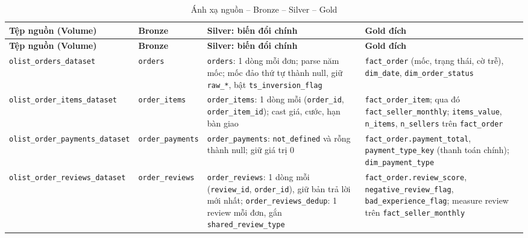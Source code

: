 \documentclass[a4paper]{article}
\begin{document}
{\footnotesize
\setlength{\tabcolsep}{3pt}
\renewcommand{\arraystretch}{1.12}
\begin{longtable}{@{}>{\raggedright\arraybackslash}p{2.9cm}>{\raggedright\arraybackslash}p{2.5cm}>{\raggedright\arraybackslash}p{5.2cm}>{\raggedright\arraybackslash}p{5.2cm}@{}}
\caption{Ánh xạ nguồn -- Bronze -- Silver -- Gold}\label{tab:pl_s2t}\\
\toprule
\textbf{Tệp nguồn (Volume)} & \textbf{Bronze} & \textbf{Silver: biến đổi chính} & \textbf{Gold đích} \\
\midrule
\endfirsthead
\toprule
\textbf{Tệp nguồn (Volume)} & \textbf{Bronze} & \textbf{Silver: biến đổi chính} & \textbf{Gold đích} \\
\midrule
\endhead
\bottomrule
\endfoot
\texttt{olist\_\allowbreak{}orders\_\allowbreak{}dataset} & \texttt{orders} & \texttt{orders}: 1 dòng mỗi đơn; parse năm mốc; mốc đảo thứ tự thành null, giữ \texttt{raw\_\allowbreak{}*}, bật \texttt{ts\_\allowbreak{}inversion\_\allowbreak{}flag} & \texttt{fact\_\allowbreak{}order} (mốc, trạng thái, cờ trễ), \texttt{dim\_\allowbreak{}date}, \texttt{dim\_\allowbreak{}order\_\allowbreak{}status} \\
\addlinespace
\texttt{olist\_\allowbreak{}order\_\allowbreak{}items\_\allowbreak{}dataset} & \texttt{order\_\allowbreak{}items} & \texttt{order\_\allowbreak{}items}: 1 dòng mỗi (\texttt{order\_\allowbreak{}id}, \texttt{order\_\allowbreak{}item\_\allowbreak{}id}); cast giá, cước, hạn bàn giao & \texttt{fact\_\allowbreak{}order\_\allowbreak{}item}; qua đó \texttt{fact\_\allowbreak{}seller\_\allowbreak{}monthly}; \texttt{items\_\allowbreak{}value}, \texttt{n\_\allowbreak{}items}, \texttt{n\_\allowbreak{}sellers} trên \texttt{fact\_\allowbreak{}order} \\
\addlinespace
\texttt{olist\_\allowbreak{}order\_\allowbreak{}payments\_\allowbreak{}dataset} & \texttt{order\_\allowbreak{}payments} & \texttt{order\_\allowbreak{}payments}: \texttt{not\_\allowbreak{}defined} và rỗng thành null; giữ giá trị 0 & \texttt{fact\_\allowbreak{}order.payment\_\allowbreak{}total}, \texttt{payment\_\allowbreak{}type\_\allowbreak{}key} (thanh toán chính); \texttt{dim\_\allowbreak{}payment\_\allowbreak{}type} \\
\addlinespace
\texttt{olist\_\allowbreak{}order\_\allowbreak{}reviews\_\allowbreak{}dataset} & \texttt{order\_\allowbreak{}reviews} & \texttt{order\_\allowbreak{}reviews}: 1 dòng mỗi (\texttt{review\_\allowbreak{}id}, \texttt{order\_\allowbreak{}id}), giữ bản trả lời mới nhất; \texttt{order\_\allowbreak{}reviews\_\allowbreak{}dedup}: 1 review mỗi đơn, gắn \texttt{shared\_\allowbreak{}review\_\allowbreak{}type} & \texttt{fact\_\allowbreak{}order.review\_\allowbreak{}score}, \texttt{negative\_\allowbreak{}review\_\allowbreak{}flag}, \texttt{bad\_\allowbreak{}experience\_\allowbreak{}flag}; measure review trên \texttt{fact\_\allowbreak{}seller\_\allowbreak{}monthly} \\

\end{longtable}}
\end{document}
